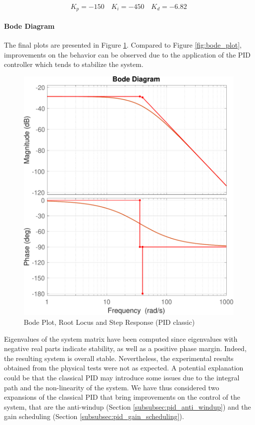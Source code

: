 \begin{equation}
    K_p = -150 \quad K_i = -450 \quad K_d = -6.82
\end{equation}

\paragraph{Bode Diagram}

The final plots are presented in Figure \ref{fig:pid_classical_bode}.
Compared to Figure \ref{fig:bode_plot}, improvements on the behavior can be observed due to the application of the PID controller which tends to stabilize the system.

\begin{figure}[H]
    \centering
    \includegraphics[width=1\linewidth]{./img/MATLAB/controllers/PID_classical.pdf}
    \caption{Bode Plot, Root Locus and Step Response (PID classic)}
    \label{fig:pid_classical_bode}
\end{figure}

Eigenvalues of the system matrix have been computed since eigenvalues with negative real parts indicate stability, as well as a positive phase margin.
Indeed, the resulting system is overall stable.
Nevertheless, the experimental results obtained from the physical tests were not as expected.
A potential explanation could be that the classical PID may introduce some issues due to the integral path and the non-linearity of the system.
We have thus considered two expansions of the classical PID that bring improvements on the control of the system, that are the anti-windup (Section \ref{subsubsec:pid_anti_windup}) and the gain scheduling (Section \ref{subsubsec:pid_gain_scheduling}).



